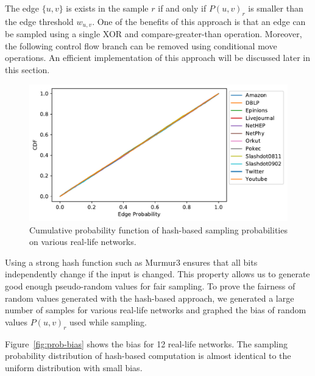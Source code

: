 \documentclass[10pt,journal,compsoc]{IEEEtran}
\begin{document}
The edge $\{u,v\}$ is exists in the sample $r$ if and only if  ${P}(u,v)_r$ is smaller than the edge threshold $w_{u,v}$. One of the benefits of this approach is that an edge can be sampled using a single XOR and compare-greater-than operation. Moreover, the following control flow branch can be removed using conditional move operations. 
An efficient implementation of this approach will be discussed later in this section.
\begin{figure}[!ht] 
    \centering
    \includegraphics[width=1\linewidth]{./images/CDF.pdf}
    \caption{Cumulative probability function of hash-based sampling probabilities on various real-life networks.}
    \label{fig:prob-cdf} 
\end{figure}
Using a strong hash function such as {{\sc Murmur3}} ensures that all bits independently change if the input is changed. This property allows us to generate good enough pseudo-random values for fair sampling. To prove the fairness of random values generated with the hash-based approach, we generated a large number of samples for various real-life networks and graphed the bias of random values $P(u,v)_r$ used while sampling.

Figure~\ref{fig:prob-bias} shows the bias for 12 real-life networks. The sampling probability distribution of hash-based computation is almost identical to the uniform distribution with small bias.
\end{document}
